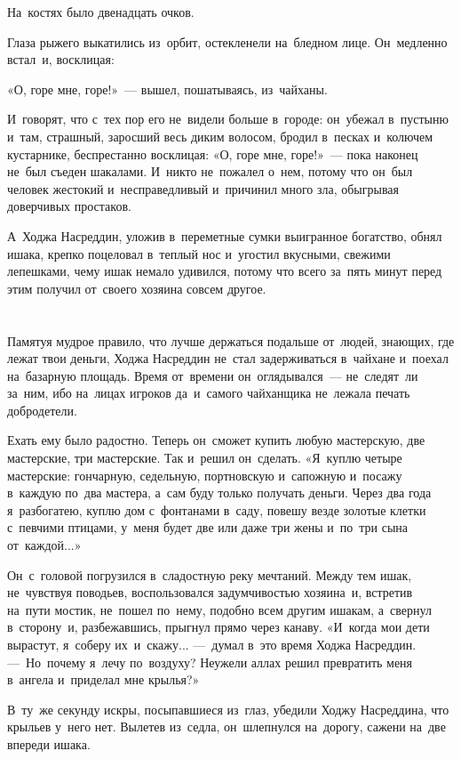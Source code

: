 \documentclass[12pt,a4paper]{book}
\begin{document}
На~костях было двенадцать очков.

Глаза рыжего выкатились из~орбит, остекленели на~бледном лице. Он~медленно встал~и, восклицая:

«О, горе мне, горе!»~— вышел, пошатываясь, из~чайханы.

И~говорят, что с~тех пор его не~видели больше в~городе: он~убежал в~пустыню и~там, страшный, заросший весь диким волосом, бродил в~песках и~колючем кустарнике, беспрестанно восклицая: «О, горе мне, горе!»~— пока наконец не~был съеден шакалами. И~никто не~пожалел о~нем, потому что он~был человек жестокий и~несправедливый и~причинил много зла, обыгрывая доверчивых простаков.

А~Ходжа Насреддин, уложив в~переметные сумки выигранное богатство, обнял ишака, крепко поцеловал в~теплый нос и~угостил вкусными, свежими лепешками, чему ишак немало удивился, потому что всего за~пять минут перед этим получил от~своего хозяина совсем другое.


\chapter{}

Памятуя мудрое правило, что лучше держаться подальше от~людей, знающих, где лежат твои деньги, Ходжа Насреддин не~стал задерживаться в~чайхане и~поехал на~базарную площадь. Время от~времени он~оглядывался~— не~следят~ли за~ним, ибо на~лицах игроков да~и~самого чайханщика не~лежала печать добродетели.

Ехать ему было радостно. Теперь он~сможет купить любую мастерскую, две мастерские, три мастерские. Так и~решил он~сделать. «Я~куплю четыре мастерские: гончарную, седельную, портновскую и~сапожную и~посажу в~каждую по~два мастера, а~сам буду только получать деньги. Через два года я~разбогатею, куплю дом с~фонтанами в~саду, повешу везде золотые клетки с~певчими птицами, у~меня будет две или даже три жены и~по~три сына от~каждой...»

Он~с~головой погрузился в~сладостную реку мечтаний. Между тем ишак, не~чувствуя поводьев, воспользовался задумчивостью хозяина~и, встретив на~пути мостик, не~пошел по~нему, подобно всем другим ишакам, а~свернул в~сторону~и, разбежавшись, прыгнул прямо через канаву. «И~когда мои дети вырастут, я~соберу их~и~скажу... —~думал в~это время Ходжа Насреддин. —~Но~почему я~лечу по~воздуху? Неужели аллах решил превратить меня в~ангела и~приделал мне крылья?»

В~ту~же секунду искры, посыпавшиеся из~глаз, убедили Ходжу Насреддина, что крыльев у~него нет. Вылетев из~седла, он~шлепнулся на~дорогу, сажени на~две впереди ишака.
\end{document}
